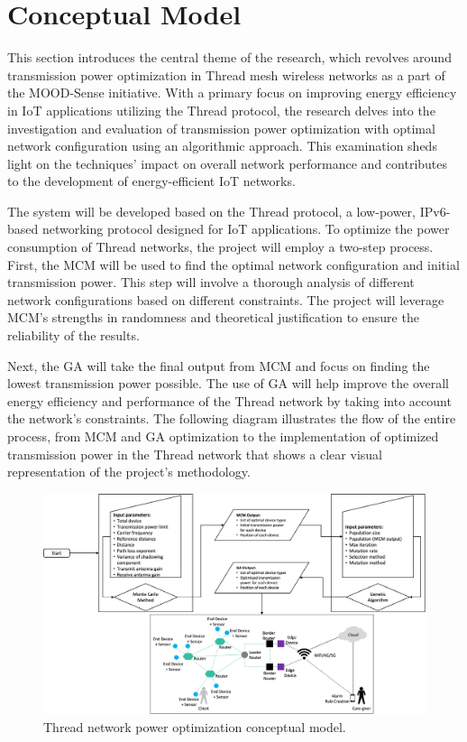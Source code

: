 \chapter{Conceptual Model}\label{chap:conceptual_model}

This section introduces the central theme of the research, which revolves around transmission power optimization in Thread mesh wireless networks as a part of the MOOD-Sense initiative. With a primary focus on improving energy efficiency in \gls{IoT} applications utilizing the Thread protocol, the research delves into the investigation and evaluation of transmission power optimization with optimal network configuration using an algorithmic approach. This examination sheds light on the techniques' impact on overall network performance and contributes to the development of energy-efficient \gls{IoT} networks.

The system will be developed based on the Thread protocol, a low-power, \gls{IPv6}-based networking protocol designed for \gls{IoT} applications. To optimize the power consumption of Thread networks, the project will employ a two-step process. First, the \gls{MCM} will be used to find the optimal network configuration and initial transmission power. This step will involve a thorough analysis of different network configurations based on different constraints. The project will leverage \gls{MCM}'s strengths in randomness and theoretical justification to ensure the reliability of the results.

Next, the \gls{GA} will take the final output from \gls{MCM} and focus on finding the lowest transmission power possible. The use of \gls{GA} will help improve the overall energy efficiency and performance of the Thread network by taking into account the network's constraints. The following diagram illustrates the flow of the entire process, from \gls{MCM} and \gls{GA} optimization to the implementation of optimized transmission power in the Thread network that shows a clear visual representation of the project's methodology.

\begin{figure}[H]
    \centering
    \includegraphics[width=1\textwidth]{images/conceptual_model/conceptual-model.png}
    \caption{Thread network power optimization conceptual model.}
    \label{fig:conceptual_model}
\end{figure}

